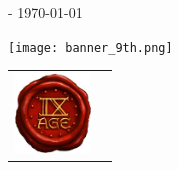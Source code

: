 
\begin{titlepage}
\begin{center}

\ifdef{\booktitle}{}{\newcommand{\booktitle}{Missing title}}
\ifdef{\version}{}{\newcommand{\version}{Missing version}}

{\titlefont\fontsize{40}{48}\selectfont\noindent{}

}

\vspace*{10pt}

{\titlefont\fontsize{50}{60}\selectfont \booktitle
\vspace{5pt}

\fontsize{14}{16.8}\selectfont \forversion{} - \today{}

\faqversion{}

\ifdef{\translationversion}{{\fontsize{14}{16.8}\selectfont \vspace{3pt}\noindent{}\translationversion}}{}}

\vspace*{20pt}
\texttt{[image: banner\_9th.png]}

\end{center}

\basictitle{\howtousethisdocumenttitle}

\howtousethisdocumenttext{}

\newrule{\recentchangessentence}

\vfill

\begin{center}
\begin{tabular}{@{}m{2cm}@{\hskip 20pt}m{13cm}@{}}
\includegraphics[width=2cm]{../Layout/pics/seal_9th.png} &
{\fontsize{10}{12}\selectfont \textcolor{black!50}{\noindent{}}}

\ifdef{\frontpageaddstuff}{{\fontsize{10}{12}\selectfont \noindent\textcolor{black!50}{\frontpageaddstuff}}}{}

\vspace*{10pt}
\noindent{\fontsize{10}{12}\selectfont \textcolor{black!50}{\labels@license}}
\tabularnewline
\end{tabular}


\end{center}
\end{titlepage}
